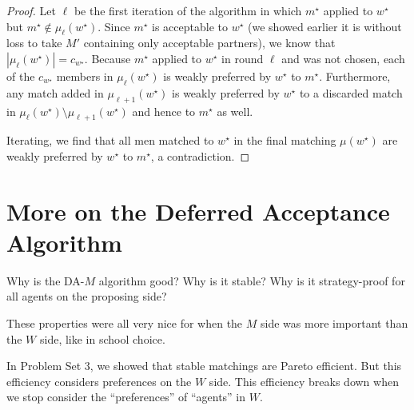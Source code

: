\begin{proof}
	Let $\ell$ be the first iteration of the algorithm in which $m^\star$ applied to $w^\star$ but $m^\star \not\in \mu_\ell(w^\star)$. 
	Since $m^\star$ is acceptable to $w^\star$ (we showed earlier it is without loss to take $M'$ containing only acceptable partners), we know that $\left| \mu_\ell(w^\star) \right| = c_{w^\star}$.
	Because $m^\star$ applied to $w^\star$ in round $\ell$ and was not chosen, each of the $c_{w^\star}$ members in $\mu_\ell(w^\star)$ is weakly preferred by $w^\star$ to $m^\star$.
	Furthermore, any match added in $\mu_{\ell + 1}(w^\star)$ is weakly preferred by $w^\star$ to a discarded match in $\mu_{\ell}(w^\star) \setminus \mu_{\ell + 1}(w^\star)$ and hence to $m^\star$ as well.

	Iterating, we find that all men matched to $w^\star$ in the final matching $\mu(w^\star)$ are weakly preferred by $w^\star$ to $m^\star$, a contradiction.
\end{proof}
\section{More on the Deferred Acceptance Algorithm}

Why is the DA-$M$ algorithm good? Why is it stable? Why is it strategy-proof for all agents on the proposing side?

These properties were all very nice for when the $M$ side was more important than the $W$ side, like in school choice.

In Problem Set 3, we showed that stable matchings are Pareto efficient. But this efficiency considers preferences on the $W$ side.
This efficiency breaks down when we stop consider the ``preferences'' of ``agents'' in $W$.


